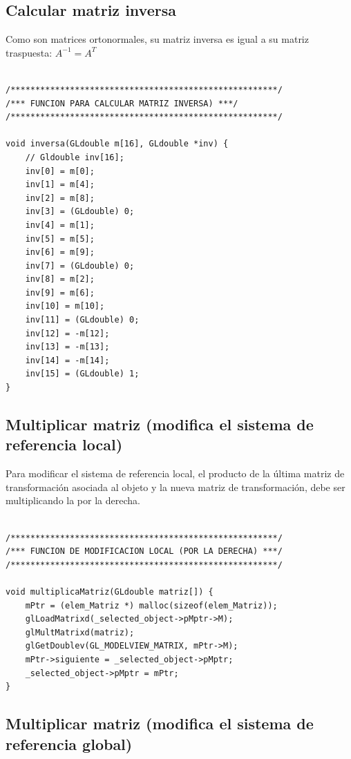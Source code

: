 \documentclass[12pt,a4paper]{article}
\begin{document}
\subsection{Calcular matriz inversa}

Como son matrices ortonormales, su matriz inversa es igual a su matriz traspuesta: $A^{-1} = A^T$

\begin{lstlisting}

/******************************************************/
/*** FUNCION PARA CALCULAR MATRIZ INVERSA) ***/
/******************************************************/

void inversa(GLdouble m[16], GLdouble *inv) {
    // Gldouble inv[16];
    inv[0] = m[0];
    inv[1] = m[4];
    inv[2] = m[8];
    inv[3] = (GLdouble) 0;
    inv[4] = m[1];
    inv[5] = m[5];
    inv[6] = m[9];
    inv[7] = (GLdouble) 0;
    inv[8] = m[2];
    inv[9] = m[6];
    inv[10] = m[10];
    inv[11] = (GLdouble) 0;
    inv[12] = -m[12];
    inv[13] = -m[13];
    inv[14] = -m[14];
    inv[15] = (GLdouble) 1;
}

\end{lstlisting}

\subsection{Multiplicar matriz (modifica el sistema de referencia local)}

Para modificar el sistema de referencia local, el producto de la última matriz de transformación asociada al objeto y la nueva matriz de transformación, debe ser multiplicando la por la derecha.

\begin{lstlisting}

/******************************************************/
/*** FUNCION DE MODIFICACION LOCAL (POR LA DERECHA) ***/
/******************************************************/

void multiplicaMatriz(GLdouble matriz[]) {
    mPtr = (elem_Matriz *) malloc(sizeof(elem_Matriz));
    glLoadMatrixd(_selected_object->pMptr->M);
    glMultMatrixd(matriz);
    glGetDoublev(GL_MODELVIEW_MATRIX, mPtr->M);
    mPtr->siguiente = _selected_object->pMptr;
    _selected_object->pMptr = mPtr;
}

\end{lstlisting}

\subsection{Multiplicar matriz (modifica el sistema de referencia global)}
\end{document}
